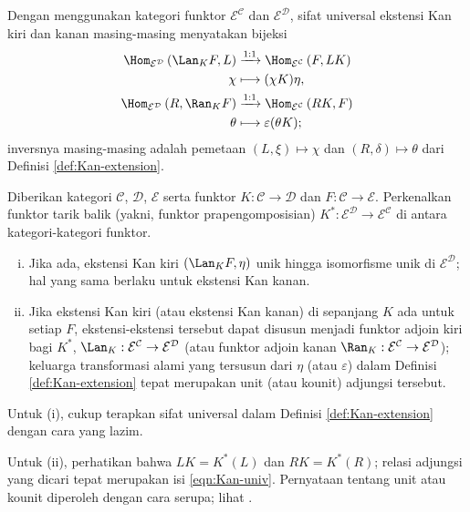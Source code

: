 Dengan menggunakan kategori funktor $\mathcal{E}^{\mathcal{C}}$ dan
$\mathcal{E}^{\mathcal{D}}$, sifat universal ekstensi Kan kiri dan kanan
masing-masing menyatakan bijeksi
\begin{equation}\label{eqn:Kan-univ}\begin{aligned}
	\Hom_{\mathcal{E}^{\mathcal{D}}}\left( \Lan_K F, L \right) & \xrightarrow{1:1} \Hom_{\mathcal{E}^{\mathcal{C}}}\left( F, LK \right) \\
	\chi & \longmapsto (\chi K)\eta , \\
	\Hom_{\mathcal{E}^{\mathcal{D}}}\left( R, \Ran_K F \right) & \xrightarrow{1:1} \Hom_{\mathcal{E}^{\mathcal{C}}}\left( RK, F \right) \\
	\theta & \longmapsto \varepsilon (\theta K);
\end{aligned}\end{equation}
inversnya masing-masing adalah pemetaan $(L, \xi) \mapsto \chi$ dan
$(R, \delta) \mapsto \theta$ dari Definisi \ref{def:Kan-extension}.

\begin{proposisi}\label{prop:Kan-uniqueness}
	Diberikan kategori $\mathcal{C}$, $\mathcal{D}$, $\mathcal{E}$ serta funktor
	$K: \mathcal{C} \to \mathcal{D}$ dan $F: \mathcal{C} \to \mathcal{E}$.
	Perkenalkan funktor tarik balik (yakni, funktor prapengomposisian)
	$K^*: \mathcal{E}^{\mathcal{D}} \to \mathcal{E}^{\mathcal{C}}$ di antara
	kategori-kategori funktor.
	\begin{enumerate}[(i)]
		\item Jika ada, ekstensi Kan kiri $(\Lan_K F, \eta)$ unik hingga
		isomorfisme unik di $\mathcal{E}^{\mathcal{D}}$; hal yang sama berlaku
		untuk ekstensi Kan kanan.
		\item Jika ekstensi Kan kiri (atau ekstensi Kan kanan) di sepanjang $K$
		ada untuk setiap $F$, ekstensi-ekstensi tersebut dapat disusun menjadi
		funktor adjoin kiri bagi $K^*$,
		$\Lan_K: \mathcal{E}^{\mathcal{C}} \to \mathcal{E}^{\mathcal{D}}$
		(atau funktor adjoin kanan
		$\Ran_K: \mathcal{E}^{\mathcal{C}} \to \mathcal{E}^{\mathcal{D}}$);
		keluarga transformasi alami yang tersusun dari $\eta$ (atau
		$\varepsilon$) dalam Definisi \ref{def:Kan-extension} tepat merupakan
		unit (atau kounit) adjungsi tersebut.
	\end{enumerate}
\end{proposisi}
\begin{bukti}
	Untuk (i), cukup terapkan sifat universal dalam Definisi
	\ref{def:Kan-extension} dengan cara yang lazim.

	Untuk (ii), perhatikan bahwa $LK = K^*(L)$ dan $RK = K^*(R)$; relasi
	adjungsi yang dicari tepat merupakan isi \eqref{eqn:Kan-univ}. Pernyataan
	tentang unit atau kounit diperoleh dengan cara serupa; lihat
	\cite[Proposisi 2.6.5]{Li1}.
\end{bukti}

